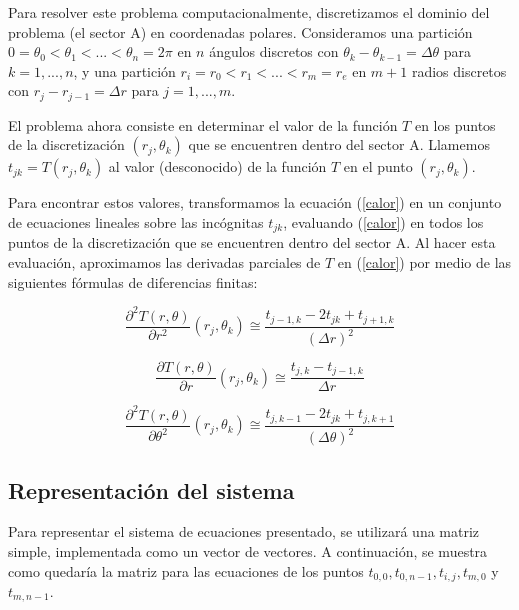 \medskip

Para resolver este problema computacionalmente, discretizamos el dominio del problema (el sector A) en coordenadas polares. Consideramos una partici\'on $0 = \theta_0 < \theta_1 < ... < \theta_n = 2\pi$ en $n$ \'angulos discretos con $\theta_k-\theta_{k-1} = \Delta\theta$ para $k = 1,...,n$, y una partici\'on $r_i = r_0 < r_1 < ... < r_m = r_e$ en $m+1$ radios discretos con $r_j - r_{j-1} = \Delta r$ para $j = 1,...,m$.

\medskip

El problema ahora consiste en determinar el valor de la funci\'on $T$ en los puntos de la discretizaci\'on $(r_j,\theta_k)$ que se encuentren dentro del sector A. Llamemos $t_{jk} = T(r_j,\theta_k)$ al valor (desconocido) de la funci\'on $T$ en el punto $(r_j,\theta_k)$.

\medskip

Para encontrar estos valores, transformamos la ecuaci\'on (\ref{calor}) en un conjunto de ecuaciones lineales sobre las inc\'ognitas $t_{jk}$, evaluando (\ref{calor}) en todos los puntos de la discretizaci\'on que se encuentren dentro del sector A. Al hacer esta evaluaci\'on, aproximamos las derivadas parciales de $T$ en (\ref{calor}) por medio de las siguientes f\'ormulas de diferencias finitas:


\begin{equation}
\frac{\partial^2T(r,\theta)}{\partial r^2}(r_j,\theta_k) \cong \frac{t_{j-1,k}-2t_{jk}+t_{j+1,k}}{(\Delta r)^2}
\end{equation}

\begin{equation}
\frac{\partial T(r,\theta)}{\partial r}(r_j,\theta_k) \cong \frac{t_{j,k}-t_{j-1,k}}{\Delta r}
\end{equation}

\begin{equation}
\frac{\partial^2T(r,\theta)}{\partial \theta^2}(r_j,\theta_k) \cong \frac{t_{j,k-1}-2t_{jk}+t_{j,k+1}}{(\Delta \theta)^2}
\end{equation}


\subsection{Representación del sistema}

Para representar el sistema de ecuaciones presentado, se utilizará una matriz simple, implementada como un vector de vectores. A continuación, se muestra como quedaría la matriz para las ecuaciones de los puntos $t_{0,0}, t_{0,n-1}, t_{i,j}, t_{m,0}$ y $t_{m,n-1}$.

